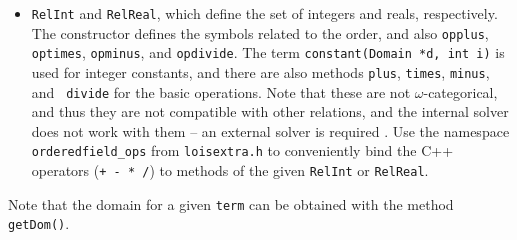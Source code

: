 \begin{itemize}
\item {\tt RelInt} and {\tt RelReal}, which define the set of integers and reals,
respectively. The constructor defines
the symbols related to the order, and also {\tt opplus}, {\tt optimes}, {\tt opminus},
and {\tt opdivide}. The term {\tt constant(Domain *d, int i)} is used for integer
constants, and there are also methods {\tt plus}, {\tt times}, {\tt minus}, and {\tt
divide} for the basic operations.
Note that these are not $\omega$-categorical,
and thus they are not compatible with other relations, and the internal solver does
not work with them -- an external solver is required \cite{lois-sat}.
Use the namespace {\tt orderedfield\_ops} from {\tt loisextra.h} to conveniently 
bind the C++ operators (\texttt{+ - * /}) to methods of the given {\tt RelInt} or
{\tt RelReal}.
\end{itemize}

Note that the domain for a given {\tt term} can be obtained with the method {\tt getDom()}.
